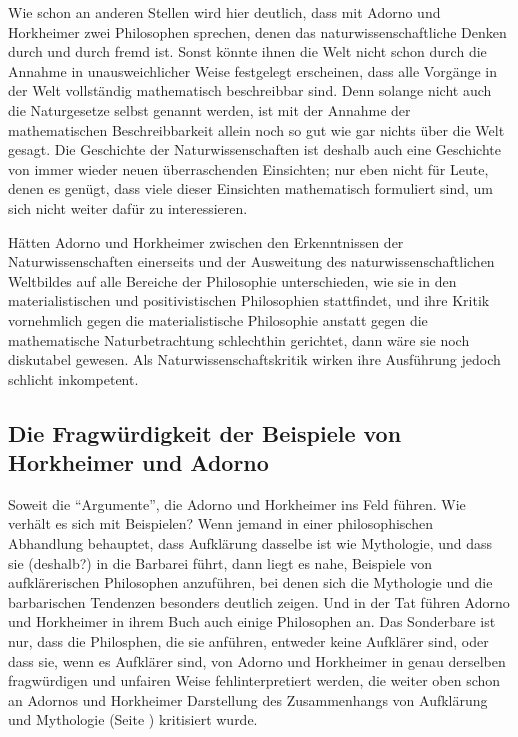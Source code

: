 \documentclass[12pt,a4paper,ngerman]{article}
\begin{document}
Wie schon an anderen Stellen wird hier deutlich, dass mit Adorno und
Horkheimer zwei Philosophen sprechen, denen das naturwissenschaftliche
Denken durch und durch fremd ist. Sonst könnte ihnen die Welt nicht
schon durch die Annahme in unausweichlicher Weise festgelegt
erscheinen, dass alle Vorgänge in der Welt vollständig mathematisch
beschreibbar sind. Denn solange nicht auch die Naturgesetze
selbst genannt werden, ist mit der Annahme der mathematischen
Beschreibbarkeit allein noch so gut wie gar nichts über die Welt
gesagt. Die Geschichte der Naturwissenschaften ist deshalb auch eine
Geschichte von immer wieder neuen überraschenden Einsichten; nur eben
nicht für Leute, denen es genügt, dass viele dieser Einsichten
mathematisch formuliert sind, um sich nicht weiter dafür zu
interessieren.

Hätten Adorno und Horkheimer zwischen den Erkenntnissen der
Naturwissenschaften einerseits und der Ausweitung des
naturwissenschaftlichen Weltbildes auf alle Bereiche der Philosophie
unterschieden, wie sie in den materialistischen und positivistischen
Philosophien stattfindet, und ihre Kritik vornehmlich gegen die
materialistische Philosophie anstatt gegen die mathematische
Naturbetrachtung schlechthin gerichtet, dann wäre sie noch diskutabel
gewesen. Als Naturwissenschaftskritik wirken ihre Ausführung jedoch
schlicht inkompetent.

\subsection{Die Fragwürdigkeit der Beispiele von Horkheimer und Adorno}

Soweit die "`Argumente"', die Adorno und Horkheimer ins Feld führen. Wie
verhält es sich mit Beispielen? Wenn jemand in einer philosophischen
Abhandlung behauptet, dass Aufklärung dasselbe ist wie Mythologie, und dass
sie (deshalb?) in die Barbarei führt, dann liegt es nahe, Beispiele von
aufklärerischen Philosophen anzuführen, bei denen sich die Mythologie und die
barbarischen Tendenzen besonders deutlich zeigen. Und in der Tat führen Adorno
und Horkheimer in ihrem Buch auch einige Philosophen an. Das Sonderbare ist
nur, dass die Philosphen, die sie anführen, entweder keine Aufklärer sind,
oder dass sie, wenn es Aufklärer sind, von Adorno und Horkheimer in genau
derselben fragwürdigen und unfairen Weise fehlinterpretiert werden, die weiter
oben schon an Adornos und Horkheimer Darstellung des Zusammenhangs von
Aufklärung und Mythologie (Seite
\pageref{Kritik_naturwissenschaftlichen_Denkens}) kritisiert wurde.
\end{document}
